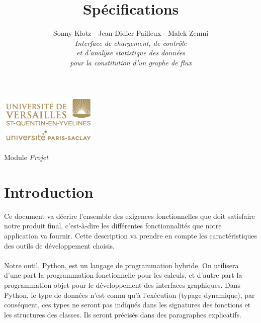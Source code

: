 

\title{\vspace{\fill}\textbf{\Huge Spécifications}}
\author{
	Sonny Klotz - Jean-Didier Pailleux - Malek Zemni
	\vspace{2em}\\
	\textit{Interface de chargement, de contrôle}\\\textit{et d’analyse statistique des données}\\\textit{pour la constitution d’un graphe de flux}
	\vspace{2em}
}


\clearpage
\maketitle\vspace{8em}
\begin{center}\includegraphics[scale=0.7]{../Cahier/logo.png}\end{center}
\begin{flushright}Module \textit{Projet}\end{flushright}
\newpage
\tableofcontents
\newpage\clearpage{}

	\section*{Introduction}
		Ce document va décrire l'ensemble des exigences fonctionnelles que doit satisfaire notre produit final, c'est-à-dire les différentes fonctionnalités que notre application va fournir. Cette description va prendre en compte les caractéristiques des outils de développement choisis.
		\paragraph{}Notre outil, Python, est un langage de programmation hybride. On utilisera d'une part la programmation fonctionnelle pour les calculs, et d'autre part la programmation objet pour le développement des interfaces graphiques. Dans Python, le type de données n'est connu qu'à l'exécution (typage dynamique), par conséquent, ces types ne seront pas indiqués dans les signatures des fonctions et les structures des classes. Ils seront précisés dans des paragraphes explicatifs.
